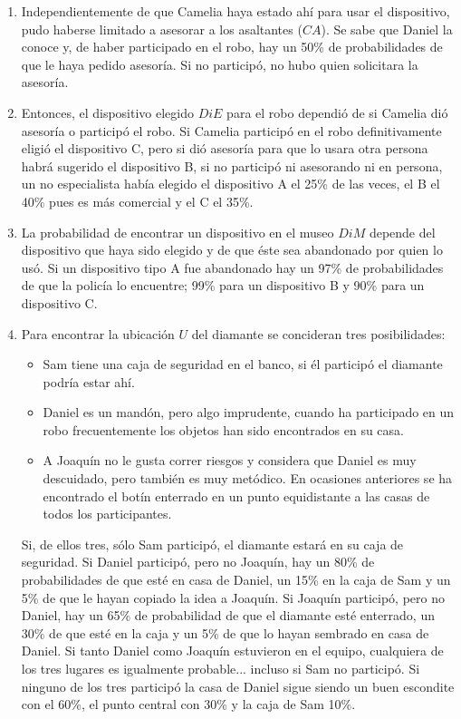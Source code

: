 \begin{enumerate}
 \item Independientemente de que Camelia haya estado ahí para usar el dispositivo, pudo haberse limitado a asesorar a los asaltantes ($CA$). Se sabe que Daniel la conoce y, de haber participado en el robo, hay un 50\% de probabilidades de que le haya pedido asesoría. Si no participó, no hubo quien solicitara la asesoría.

 \item Entonces, el dispositivo elegido $DiE$ para el robo dependió de si Camelia dió asesoría o participó el robo.  Si Camelia participó en el robo definitivamente eligió el dispositivo C, pero si dió asesoría para que lo usara otra persona habrá sugerido el dispositivo B, si no participó ni asesorando ni en persona, un no especialista había elegido el dispositivo A el 25\% de las veces, el B el 40\% pues es más comercial y el C el 35\%.

 \item La probabilidad de encontrar un dispositivo en el museo $DiM$ depende del dispositivo que haya sido elegido y de que éste sea abandonado por quien lo usó.  Si un dispositivo tipo A fue abandonado hay un 97\% de probabilidades de que la policía lo encuentre; 99\% para un dispositivo B y 90\% para un dispositivo C.

 \item Para encontrar la ubicación $U$ del diamante se concideran tres posibilidades:
 \begin{itemize}
  \item Sam tiene una caja de seguridad en el banco, si él participó el diamante podría estar ahí.
  \item Daniel es un mandón, pero algo imprudente, cuando ha participado en un robo frecuentemente los objetos han sido encontrados en su casa.
  \item A Joaquín no le gusta correr riesgos y considera que Daniel es muy descuidado, pero también es muy metódico.  En ocasiones anteriores se ha encontrado el botín enterrado en un punto equidistante a las casas de todos los participantes.
 \end{itemize}
 Si, de ellos tres, sólo Sam participó, el diamante estará en su caja de seguridad.  Si Daniel participó, pero no Joaquín, hay un 80\% de probabilidades de que esté en casa de Daniel, un 15\% en la caja de Sam y un 5\% de que le hayan copiado la idea a Joaquín.  Si Joaquín participó, pero no Daniel, hay un 65\% de probabilidad de que el diamante esté enterrado, un 30\% de que esté en la caja y un 5\% de que lo hayan sembrado en casa de Daniel.  Si tanto Daniel como Joaquín estuvieron en el equipo, cualquiera de los tres lugares es igualmente probable... incluso si Sam no participó.  Si ninguno de los tres participó la casa de Daniel sigue siendo un buen escondite con el 60\%, el punto central con 30\% y la caja de Sam 10\%.

\end{enumerate}



